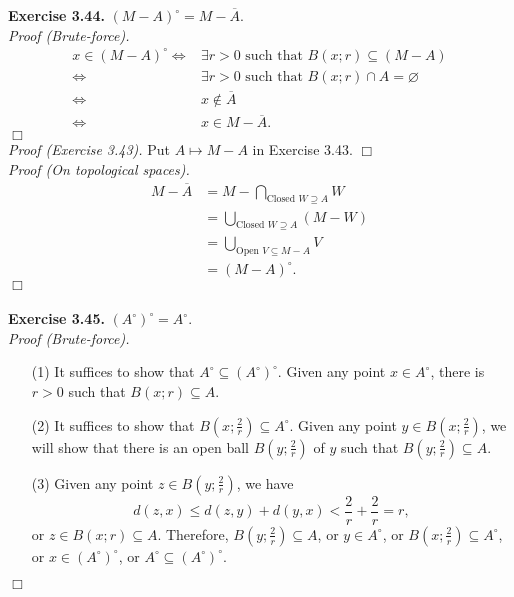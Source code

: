 \documentclass{article}
\begin{document}
\textbf{Exercise 3.44.}
\emph{$(M-A)^{\circ} = M - \overline{A}.$} \\

\emph{Proof (Brute-force).}
\begin{align*}
x \in (M-A)^{\circ}
\Longleftrightarrow&
\exists r > 0 \text{ such that } B(x;r) \subseteq (M - A) \\
\Longleftrightarrow&
\exists r > 0 \text{ such that } B(x;r) \cap A = \varnothing \\
\Longleftrightarrow&
x \not\in \overline{A} \\
\Longleftrightarrow&
x \in M - \overline{A}.
\end{align*}
$\Box$ \\

\emph{Proof (Exercise 3.43).}
Put $A \mapsto M-A$ in Exercise 3.43.
$\Box$ \\

\emph{Proof (On topological spaces).}
\begin{align*}
M - \overline{A}
&= M - \bigcap_{\text{Closed } W \supseteq A} W \\
&= \bigcup_{\text{Closed } W \supseteq A} (M - W) \\
&= \bigcup_{\text{Open } V \subseteq M-A} V \\
&= (M - A)^{\circ}.
\end{align*}
$\Box$ \\\\






\textbf{Exercise 3.45.}
\emph{$(A^{\circ})^{\circ} = A^{\circ}.$} \\

\emph{Proof (Brute-force).}
\begin{enumerate}
\item[(1)]
It suffices to show that $A^{\circ} \subseteq (A^{\circ})^{\circ}$.
Given any point $x \in A^{\circ}$, there is $r > 0$ such that $B(x;r) \subseteq A$.
\item[(2)]
It suffices to show that $B\left(x;\frac{2}{r}\right) \subseteq A^{\circ}$.
Given any point $y \in B\left(x;\frac{2}{r}\right)$,
we will show that there is an open ball $B\left(y;\frac{2}{r}\right)$ of $y$
such that $B\left(y;\frac{2}{r}\right) \subseteq A$.
\item[(3)]
Given any point $z \in B\left(y;\frac{2}{r}\right)$, we have
$$d(z,x) \leq d(z,y) + d(y,x) < \frac{2}{r} + \frac{2}{r} = r,$$
or $z \in B(x;r) \subseteq A$.
Therefore, $B\left(y;\frac{2}{r}\right) \subseteq A$,
or $y \in A^{\circ}$,
or $B\left(x;\frac{2}{r}\right) \subseteq A^{\circ}$,
or $x \in (A^{\circ})^{\circ}$,
or $A^{\circ} \subseteq (A^{\circ})^{\circ}$.
\end{enumerate}
$\Box$ \\
\end{document}
